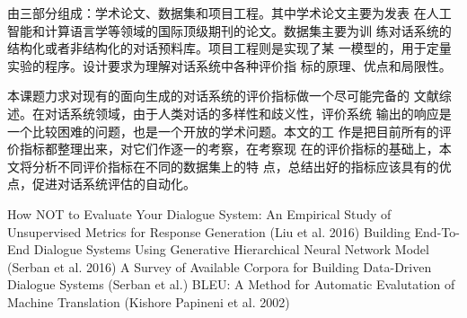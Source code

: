 
\assignReq
{由三部分组成：学术论文、数据集和项目工程。其中学术论文主要为发表}
{在人工智能和计算语言学等领域的国际顶级期刊的论文。数据集主要为训}
{练对话系统的结构化或者非结构化的对话预料库。项目工程则是实现了某}
{一模型的，用于定量实验的程序。设计要求为理解对话系统中各种评价指}
{标的原理、优点和局限性。}

\assignWork
{本课题力求对现有的面向生成的对话系统的评价指标做一个尽可能完备的}
{文献综述。在对话系统领域，由于人类对话的多样性和歧义性，评价系统}
{输出的响应是一个比较困难的问题，也是一个开放的学术问题。本文的工}
{作是把目前所有的评价指标都整理出来，对它们作逐一的考察，在考察现}
{在的评价指标的基础上，本文将分析不同评价指标在不同的数据集上的特}
{点，总结出好的指标应该具有的优点，促进对话系统评估的自动化。}

\assignRef
{How NOT to Evaluate Your Dialogue System: An Empirical Study of Unsupervised}
{Metrics for Response Generation (Liu et al. 2016)}
{Building End-To-End Dialogue Systems Using Generative Hierarchical Neural}
{Network Model (Serban et al. 2016)}
{A Survey of Available Corpora for Building Data-Driven Dialogue Systems}
{(Serban et al.)}
{BLEU: A Method for Automatic Evalutation of Machine Translation}
{(Kishore Papineni et al. 2002)}
